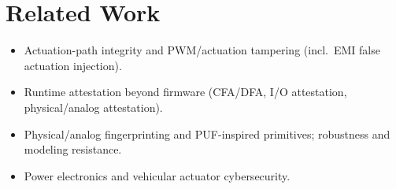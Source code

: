 \section{Related Work}
\label{sec:related-work}
\begin{itemize}
    \item Actuation-path integrity and PWM/actuation tampering (incl.\ EMI false actuation injection).
    \item Runtime attestation beyond firmware (CFA/DFA, I/O attestation, physical/analog attestation).
    \item Physical/analog fingerprinting and PUF-inspired primitives; robustness and modeling resistance.
    \item Power electronics and vehicular actuator cybersecurity.
\end{itemize}